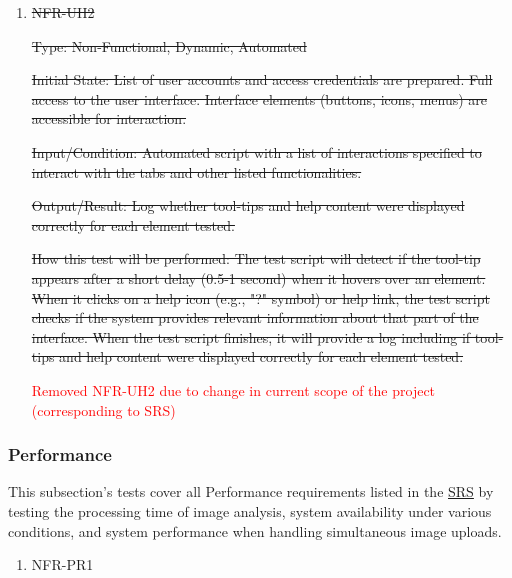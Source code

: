 \documentclass[12pt, titlepage]{article}
\begin{document}
\begin{enumerate}
\begin{enumerate}
How this test will be performed: The automated script will perform the following tasks with each user account and calculate the success rate: upload a chest X-ray image to the system, view analysis results or processed reports, adjust image settings (e.g., window/level, zoom), and export the analysis or report to a local folder.

\item{\sout{NFR-UH2}}\label{NFR-UH2}

\sout{Type: Non-Functional, Dynamic, Automated}

\sout{Initial State: List of user accounts and access credentials are prepared. Full access to the user interface. Interface elements (buttons, icons, menus) are accessible for interaction.}

\sout{Input/Condition: Automated script with a list of interactions specified to interact with the tabs and other listed functionalities.}

\sout{Output/Result: Log whether tool-tips and help content were displayed correctly for each element tested.}

\sout{How this test will be performed: The test script will detect if the tool-tip appears after a short delay (0.5-1 second) when it hovers over an element. When it clicks on a help icon (e.g., "?" symbol) or help link, the test script checks if the system provides relevant information about that part of the interface. When the test script finishes, it will provide a log including if tool-tips and help content were displayed correctly for each element tested.}


\textcolor{red}{Removed NFR-UH2 due to change in current scope of the project (corresponding to SRS)}

\end{enumerate}

\subsubsection{Performance}

This subsection's tests cover all Performance requirements listed in the \href{https://github.com/RezaJodeiri/CXR-Capstone/blob/main/docs/SRS/SRS.pdf}{SRS} \citep{SRS}
 by testing the processing time of image analysis, system availability under various conditions, and system performance when handling simultaneous image uploads.

\begin{enumerate}

\item{NFR-PR1}\label{NFR-PR1}


\end{enumerate}
\end{enumerate}
\end{document}
